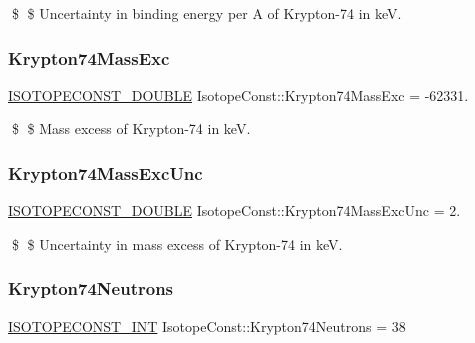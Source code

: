 \$ \$ Uncertainty in binding energy per A of Krypton-\/74 in keV. \mbox{\label{group___isotope_const-_krypton-_kr74_ga1b5e556b1870d0dfa84bb89923f784f6}} 
\subsubsection{\texorpdfstring{Krypton74\+Mass\+Exc}{Krypton74MassExc}}
{\footnotesize\ttfamily \mbox{\hyperlink{group___isotope_const-_macros_ga8f45a7272ce02c0b4c65c44636ed719a}{I\+S\+O\+T\+O\+P\+E\+C\+O\+N\+S\+T\+\_\+\+D\+O\+U\+B\+LE}} Isotope\+Const\+::\+Krypton74\+Mass\+Exc = -\/62331.}

\$ \$ Mass excess of Krypton-\/74 in keV. \mbox{\label{group___isotope_const-_krypton-_kr74_gaf9aea4ebea6eb8c11ec6da2841625c19}} 
\subsubsection{\texorpdfstring{Krypton74\+Mass\+Exc\+Unc}{Krypton74MassExcUnc}}
{\footnotesize\ttfamily \mbox{\hyperlink{group___isotope_const-_macros_ga8f45a7272ce02c0b4c65c44636ed719a}{I\+S\+O\+T\+O\+P\+E\+C\+O\+N\+S\+T\+\_\+\+D\+O\+U\+B\+LE}} Isotope\+Const\+::\+Krypton74\+Mass\+Exc\+Unc = 2.}

\$ \$ Uncertainty in mass excess of Krypton-\/74 in keV. \mbox{\label{group___isotope_const-_krypton-_kr74_gaaad3ba259d481bf1ce9ebd6d54bb3ee3}} 
\subsubsection{\texorpdfstring{Krypton74\+Neutrons}{Krypton74Neutrons}}
{\footnotesize\ttfamily \mbox{\hyperlink{group___isotope_const-_macros_ga5f18360b3e99483a35c32d789e62621c}{I\+S\+O\+T\+O\+P\+E\+C\+O\+N\+S\+T\+\_\+\+I\+NT}} Isotope\+Const\+::\+Krypton74\+Neutrons = 38}

